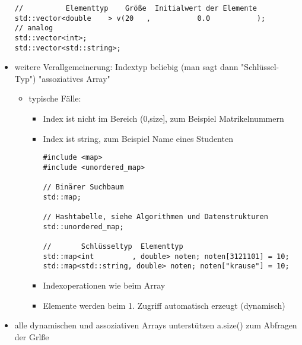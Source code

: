 \documentclass[a4paper]{scrartcl}
\theoremstyle{definition}
\theoremstyle{plain}
\theoremstyle{remark}
\theoremstyle{remark}
\begin{document}
\begin{itemize}
\begin{verbatim}
//          Elementtyp    Größe  Initialwert der Elemente
std::vector<double    > v(20   ,           0.0           );
// analog
std::vector<int>;
std::vector<std::string>;
\end{verbatim}
\item weitere Verallgemeinerung: Indextyp beliebig (man sagt dann "Schlüssel-Typ") "assoziatives Array"
\begin{itemize}
\item typische Fälle:
\begin{itemize}
\item Index ist nicht im Bereich (0,size], zum Beispiel Matrikelnummern
\item Index ist string, zum Beispiel Name eines Studenten
\begin{verbatim}
#include <map>
#include <unordered_map>

// Binärer Suchbaum
std::map;

// Hashtabelle, siehe Algorithmen und Datenstrukturen
std::unordered_map;

//       Schlüsseltyp  Elementtyp
std::map<int         , double> noten; noten[3121101] = 10;
std::map<std::string, double> noten; noten["krause"] = 10;
\end{verbatim}
\item Indexoperationen wie beim Array
\item Elemente werden beim 1. Zugriff automatisch erzeugt (dynamisch)
\end{itemize}
\end{itemize}
\item alle dynamischen und assoziativen Arrays unterstützen a.size() zum Abfragen der Grlße
\end{itemize}
\end{document}

